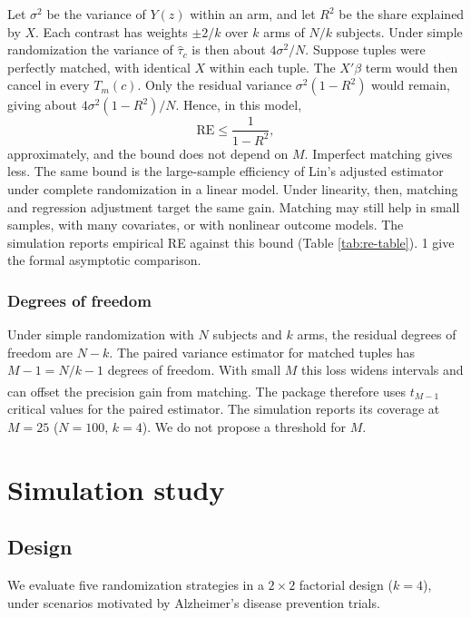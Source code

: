\documentclass[
  11pt,
]{article}
\begin{document}
Let \(\sigma^2\) be the variance of \(Y(z)\) within an arm, and
let \(R^2\) be the share explained by \(X\). Each contrast has
weights \(\pm 2/k\) over \(k\) arms of \(N/k\) subjects. Under
simple randomization the variance of \(\hat\tau_c\) is then
about \(4\sigma^2/N\). Suppose tuples were perfectly matched,
with identical \(X\) within each tuple. The \(X'\beta\) term
would then cancel in every \(T_m(c)\). Only the residual
variance \(\sigma^2(1-R^2)\) would remain, giving about
\(4\sigma^2(1-R^2)/N\). Hence, in this model,
\begin{equation}
  \text{RE} \le \frac{1}{1 - R^2} ,
\end{equation}
approximately, and the bound does not depend on \(M\).
Imperfect matching gives less. The same bound is the
large-sample efficiency of Lin's adjusted estimator under
complete randomization in a linear model. Under linearity,
then, matching and regression adjustment target the same
gain. Matching may still help in small samples, with many
covariates, or with nonlinear outcome models. The
simulation reports empirical RE against this bound
(Table \ref{tab:re-table}). 1 give the
formal asymptotic comparison.

\subsubsection{Degrees of freedom}\label{degrees-of-freedom}

Under simple randomization with \(N\) subjects and \(k\) arms,
the residual degrees of freedom are \(N - k\). The paired
variance estimator for matched tuples has \(M - 1 = N/k - 1\)
degrees of freedom. With small \(M\) this loss widens
intervals and can offset the precision gain from matching\textsuperscript{}. The package therefore uses
\(t_{M-1}\) critical values for the paired estimator. The
simulation reports its coverage at \(M = 25\)
(\(N = 100\), \(k = 4\)). We do not propose a threshold for \(M\).

\section{Simulation study}\label{simulation-study}

\subsection{Design}\label{design}

We evaluate five randomization strategies in a \(2 \times 2\)
factorial design (\(k = 4\)), under scenarios motivated by
Alzheimer's disease prevention trials.
\end{document}
